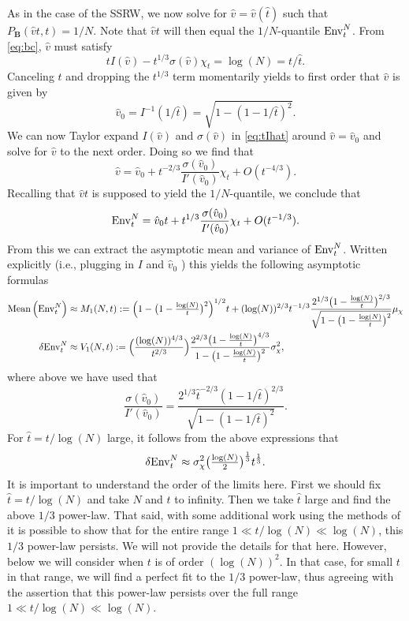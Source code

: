 As in the case of the SSRW, we now solve for $\hat v=\hat v(\hat t)$ such that $P_{\mathbf{B}}(\hat vt,t)= 1/N$. Note that $\hat vt$ will then equal the $1/N$-quantile $\mathrm{Env}^{N}_t$. From \eqref{eq:bc}, $\hat v$ must satisfy
\begin{equation}\label{eq:tIhat}
t I(\hat v) - t^{1/3} \sigma(\hat v) \chi_t =\log(N) = t/\hat{t}.
\end{equation}
Canceling $t$ and dropping the $t^{1/3}$ term momentarily yields to first order that $\hat v$ is given by
$$\hat v_0 = I^{-1}(1/\hat{t}) = \sqrt{1-(1-1/\hat{t})^2}.$$
We can now Taylor expand $I(\hat{v})$ and $\sigma(\hat v)$ in \eqref{eq:tIhat} around $\hat{v}=\hat{v}_0$ and solve for $\hat{v}$ to the next order. Doing so we find that
$$\hat{v} = \hat{v}_0 + t^{-2/3} \frac{\sigma(\hat{v}_0)}{I'(\hat{v}_0)} \chi_t + O(t^{-4/3}).$$
Recalling that $\hat{v} t$ is supposed to yield the $1/N$-quantile, we conclude that
\begin{equation}\label{eq:envntform}
\mathrm{Env}^{N}_t = \hat v_0 t + t^{1/3} \frac{\sigma(\hat v_0)}{I'(\hat v_0)}  \chi_t + O(t^{-1/3}).
\end{equation}
From this we can extract the asymptotic mean and variance of $\mathrm{Env}^{N}_t$. Written explicitly (i.e., plugging in $I$ and $\hat{v}_0$
) this yields the following asymptotic formulas
\begin{align*}
\mathrm{Mean}\left(\mathrm{Env}^{N}_t\right) &\approx M_1(N,t):= \Big(1-\big(1-\tfrac{\log(N)}{t}\big)^2\Big)^{1/2} t  +(\log(N))^{2/3} t^{-1/3}  \frac{2^{1/3} \big(1-\frac{\log(N)}{t}\big)^{2/3}}{\sqrt{1-\big(1-\frac{\log(N)}{t}\big)^2}} \mu_{\chi} \\
\var{\mathrm{Env}^{N}_t}  &\approx V_1(N,t):= \Big(\frac{(\log(N))^{4/3}}{t^{2/3}}\Big)\frac{2^{2/3}\big(1-\frac{\log(N)}{t}\big)^{4/3}}{1- \big(1- \frac{\log (N)}{t}\big)^2} \sigma_{\chi}^2 ,
\end{align*}
where above we have used that
$$
\frac{\sigma(\hat{v}_0)}{I'(\hat{v}_0)}  = \frac{2^{1/3} \hat{t}^{-2/3} (1-1/\hat{t})^{2/3}}{\sqrt{1-(1-1/\hat{t})^2}}.
$$
For $\hat{t}=t/\log(N)$ large, it follows from the above expressions that
\begin{equation}\label{eq:varenvlogN}
\var{\mathrm{Env}^{N}_t}  \approx  \sigma_{\chi}^2 \big(\tfrac{\log(N)}{2}\big)^{\frac{1}{3}} t^{\frac{1}{3}}.
\end{equation}
It is important to understand the order of the limits here. First we should fix $\hat{t}=t/\log(N)$ and take $N$ and $t$ to infinity. Then we take $\hat{t}$ large and find the above $1/3$ power-law. That said, with some additional work using the methods of  \cite{barraquand_random-walk_2017} it is possible to show that for the entire range $1\ll t/\log(N) \ll \log(N)$, this $1/3$ power-law persists. We will not provide the details for that here. However, below we will consider when $t$ is of order $(\log(N))^2$. In that case, for small $t$ in that range, we will find a perfect fit to the $1/3$ power-law, thus agreeing with the assertion that this power-law persists over the full range $1\ll t/\log(N) \ll \log(N)$.

